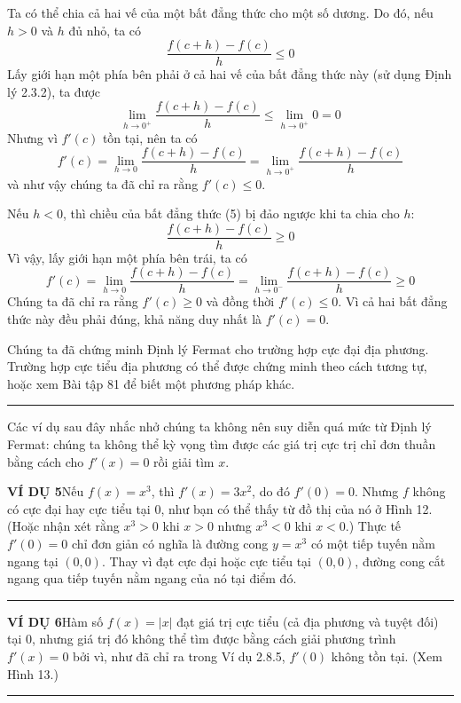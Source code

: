 \begin{minipage}[t]{0.70\textwidth}
    \noindent Ta có thể chia cả hai vế của một bất đẳng thức cho một số dương. Do đó, nếu $h > 0$ và $h$ đủ nhỏ, ta có
    \[
    \frac{f(c + h) - f(c)}{h} \leqslant 0
    \]
    Lấy giới hạn một phía bên phải ở cả hai vế của bất đẳng thức này (sử dụng Định lý 2.3.2), ta được
    \[
    \lim_{h \to 0^+} \frac{f(c + h) - f(c)}{h} \leqslant \lim_{h \to 0^+} 0 = 0
    \]
    Nhưng vì $f'(c)$ tồn tại, nên ta có
    \[
    f'(c) = \lim_{h \to 0} \frac{f(c + h) - f(c)}{h} = \lim_{h \to 0^+} \frac{f(c + h) - f(c)}{h}
    \]
    \noindent và như vậy chúng ta đã chỉ ra rằng $f'(c) \leqslant 0$.

    Nếu $h < 0$, thì chiều của bất đẳng thức (5) bị đảo ngược khi ta chia cho $h$:
    \[
    \frac{f(c + h) - f(c)}{h} \geqslant 0
    \]
    Vì vậy, lấy giới hạn một phía bên trái, ta có
    \[
    f'(c) = \lim_{h \to 0} \frac{f(c + h) - f(c)}{h} = \lim_{h \to 0^-} \frac{f(c + h) - f(c)}{h} \geqslant 0
    \]
    Chúng ta đã chỉ ra rằng $f'(c) \geqslant 0$ và đồng thời $f'(c) \leqslant 0$. Vì cả hai bất đẳng thức này đều phải đúng, khả năng duy nhất là $f'(c) = 0$.

    Chúng ta đã chứng minh Định lý Fermat cho trường hợp cực đại địa phương. Trường hợp cực tiểu địa phương có thể được chứng minh theo cách tương tự, hoặc xem Bài tập 81 để biết một phương pháp khác.\hfill{\color{stewartred}\rule{1.15ex}{1.15ex}}

    \vspace{9pt}
    Các ví dụ sau đây nhắc nhở chúng ta không nên suy diễn quá mức từ Định lý Fermat: chúng ta không thể kỳ vọng tìm được các giá trị cực trị chỉ đơn thuần bằng cách cho $f'(x) = 0$ rồi giải tìm $x$.

    \vspace{9pt}
    \noindent\textbf{\textsf{\color{stewartcyan}VÍ DỤ 5}}\quad Nếu $f(x) = x^3$, thì $f'(x) = 3x^2$, do đó $f'(0) = 0$. Nhưng $f$ không có cực đại hay cực tiểu tại 0, như bạn có thể thấy từ đồ thị của nó ở Hình 12. (Hoặc nhận xét rằng $x^3 > 0$ khi $x > 0$ nhưng $x^3 < 0$ khi $x < 0$.) Thực tế $f'(0) = 0$ chỉ đơn giản có nghĩa là đường cong $y = x^3$ có một tiếp tuyến nằm ngang tại $(0, 0)$. Thay vì đạt cực đại hoặc cực tiểu tại $(0, 0)$, đường cong cắt ngang qua tiếp tuyến nằm ngang của nó tại điểm đó.\hfill{\color{stewartcyan}\rule{1.15ex}{1.15ex}}

    \vspace{9pt}
    \noindent\textbf{\textsf{\color{stewartcyan}VÍ DỤ 6}}\quad Hàm số $f(x) = |x|$ đạt giá trị cực tiểu (cả địa phương và tuyệt đối) tại 0, nhưng giá trị đó không thể tìm được bằng cách giải phương trình $f'(x) = 0$ bởi vì, như đã chỉ ra trong Ví dụ 2.8.5, $f'(0)$ không tồn tại. (Xem Hình 13.)\hfill{\color{stewartcyan}\rule{1.15ex}{1.15ex}}


\end{minipage}
